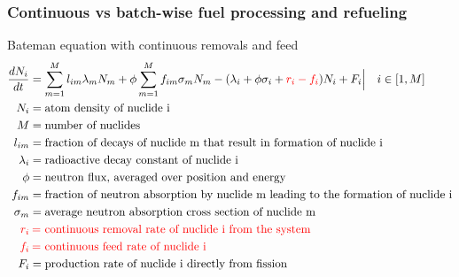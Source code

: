\begin{frame}
\frametitle{Continuous vs batch-wise fuel processing  and refueling}
\vspace{-1.3mm}
\begin{block}{Bateman equation with continuous removals and feed}
	\begin{align}
	\frac{dN_i}{dt} &= \sum_{m=1}^{M}l_{im}\lambda_mN_m + 
	\phi\sum_{m=1}^{M}f_{im}\sigma_mN_m - (\lambda_i + \phi\sigma_i + 
	\textcolor{red}{r_i - 
		f_i})N_i + F_i\Big|\quad{i\in [1,M]} \nonumber \\
	N_i &= \mbox{atom density of nuclide i} \nonumber \\
	M &= \mbox{number of nuclides} \nonumber \\
	l_{im} &= \mbox{fraction of decays of nuclide m that result in formation 
	of 
		nuclide i}\nonumber \\
	\lambda_i &= \mbox{radioactive decay constant of nuclide i} \nonumber \\
	\phi &= \mbox{neutron flux, averaged over position and energy} \nonumber \\
	f_{im} &= \mbox{fraction of neutron absorption by nuclide m leading to the 
		formation of nuclide i} \nonumber \\
	\sigma_m &= \mbox{average neutron absorption cross section of nuclide m} 
	\nonumber \\
	\textcolor{red}{r_i} & \mkern4mu \textcolor{red}{=} \mbox{\space 
	\textcolor{red}{continuous removal rate of nuclide i from the system}} 
	\nonumber \\
	\textcolor{red}{f_i} & \mkern4mu  \textcolor{red}{=} \mbox{\space 
	\textcolor{red}{continuous feed rate of nuclide i}} \nonumber \\
	F_i &= \mbox{production rate of nuclide i directly from fission}\nonumber
	\end{align}
\end{block}
\end{frame}

